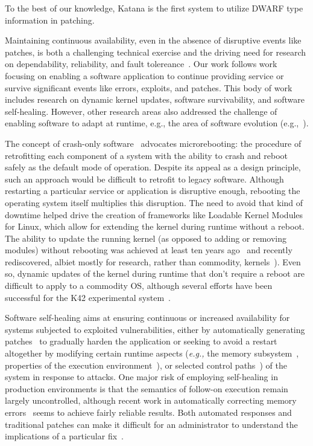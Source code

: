 To the best of our knowledge, Katana is the first system to utilize
DWARF type information in patching.

Maintaining continuous availability, even in the absence of disruptive
events like patches, is both a challenging technical exercise and the
driving need for research on dependability, reliability, and fault
tolereance~\cite{deltaexec}. 
Our work follows work focusing
 on enabling a software
application to continue providing service or survive significant
events like errors, exploits, and patches.  This body of work includes
research on dynamic kernel updates, software survivability, and
software self-healing. However, other research areas also addressed the
challenge of enabling software to adapt at runtime, e.g., the area
of software evolution (e.g.,~\cite{software-evolution}).

The concept of crash-only software~\cite{crashonly} advocates
microrebooting: the procedure of retrofitting each component of a
system with the ability to crash and reboot safely as the default mode
of operation.  Despite its appeal as a design principle, such an
approach would be difficult to retrofit to legacy software.
Although restarting a particular service or application is disruptive
enough, rebooting the operating system itself multiplies this
disruption.  
The need to avoid that kind of downtime helped drive the
creation of frameworks like Loadable Kernel Modules for Linux, which
allow for extending the kernel during runtime without a reboot.
The ability to update the running kernel (as opposed to adding
or removing modules) without rebooting was achieved at least ten years
ago~\cite{cesare1998} and recently rediscovered, albiet mostly for
research, rather than commodity,
kernels~\cite{nonLKMkernpatch,baumann2007osupdate,soules2003k42}).
Even so,
dynamic updates of the kernel during runtime that don't require a
reboot are difficult to apply to a commodity OS, although several
efforts have been successful for the K42 experimental
system~\cite{soules2003k42,baumann2005k42}.

Software self-healing aims at ensuring continuous or increased
availability for systems subjected to exploited vulnerabilities,
either by automatically generating
patches~\cite{weimer2009genetic,stelios2005usenix} to gradually harden
the application or seeking to avoid a restart altogether by modifying
certain runtime aspects ({\it e.g.,} the memory
subsystem~\cite{rinard2004osdi}, properties of the execution
environment~\cite{rx2005sosp}), 
%
or selected control
paths~\cite{dira2005,locasto2007usenix}) of the system in response to
attacks.
One major risk of employing self-healing in production environments is
that the semantics of follow-on execution remain largely uncontrolled,
although recent work in automatically correcting memory
errors~\cite{exterminator2008cacm} seems to achieve fairly reliable
results.  Both automated responses and traditional patches can make it
difficult for an administrator to understand the implications of a
particular fix~\cite{rinard.ppp}.